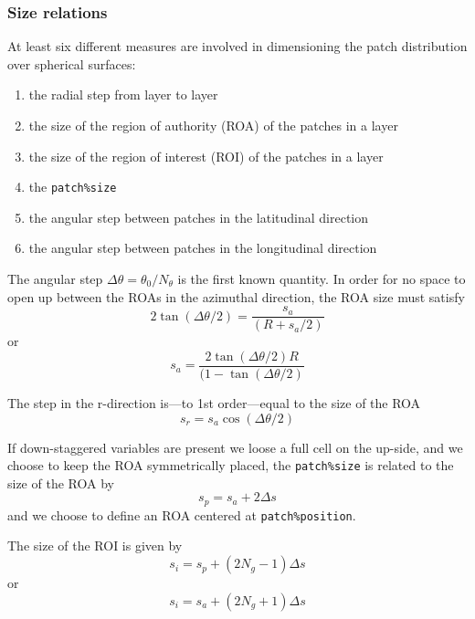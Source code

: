 \documentclass[paper=a4,fontsize=11pt]{scrartcl}
\numberwithin{equation}{section}		%
\numberwithin{figure}{section}			%
\numberwithin{table}{section}				%
\newcommand{\codecolor}{\color{Blue}}
\newcommand{\Code}[1]{{\codecolor\texttt{#1}}}
\begin{document}
\subsubsection{Size relations}
At least six different measures are involved in dimensioning the patch distribution over spherical surfaces:
\begin{enumerate}
    \item[$s_r$:] the radial step from layer to layer
    \item[$s_a$:] the size of the region of authority (ROA) of the patches in a layer
    \item[$s_i$:] the size of the region of interest (ROI) of the patches in a layer
    \item[$s_p$:] the \Code{patch\%size}
    \item[$\Delta\theta$:] the angular step  between patches in the latitudinal direction
    \item[$\Delta\phi$:] the angular step  between patches in the longitudinal direction
\end{enumerate}
The angular step $\Delta\theta=\theta_0/N_\theta$ is the first known quantity.
In order for no space to open up between the ROAs in the azimuthal direction, the ROA size must satisfy
\begin{equation}
    2\tan(\Delta \theta/2) = \frac{s_a}{(R+s_a/2)}
\end{equation}
or
\begin{equation}
    s_a = \frac{2\tan(\Delta\theta/2) R}{(1-\tan(\Delta\theta/2)}
\end{equation}

\noindent The step in the r-direction is---to 1st order---equal to the size of the ROA
\begin{equation}
    s_r = s_a \cos(\Delta\theta/2)
\end{equation}

If down-staggered variables are present we loose a full cell on the up-side, and we choose to keep the ROA symmetrically placed,  the \Code{patch\%size} is related to the size of the ROA by 
\begin{equation}
   s_p = s_a + 2\Delta s
\end{equation}
and we choose to define an ROA centered at \Code{patch\%position}.

\noindent The size of the ROI is given by
\begin{equation}
    s_i = s_p + (2 N_g -1)\Delta s
\end{equation}
or
\begin{equation}
    s_i = s_a + (2 N_g +1)\Delta s
\end{equation}
\end{document}

